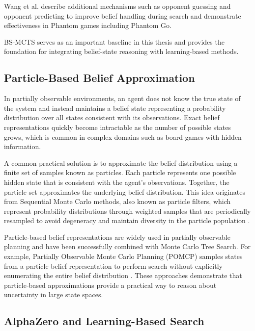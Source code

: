\documentclass[12pt,oneside,openright]{article}
\begin{document}
Wang et al. describe additional mechanisms such as opponent guessing and opponent predicting to improve belief handling during search and demonstrate effectiveness in Phantom games including Phantom Go\cite{Wang2015bsmcts}.

BS-MCTS serves as an important baseline in this thesis and provides the foundation for integrating belief-state reasoning with learning-based methods.

\subsection{Particle-Based Belief Approximation}

In partially observable environments, an agent does not know the true state of the system and instead maintains a belief state representing a probability distribution over all states consistent with its observations. Exact belief representations quickly become intractable as the number of possible states grows, which is common in complex domains such as board games with hidden information.

A common practical solution is to approximate the belief distribution using a finite set of samples known as particles. Each particle represents one possible hidden state that is consistent with the agent's observations. Together, the particle set approximates the underlying belief distribution. This idea originates from Sequential Monte Carlo methods, also known as particle filters, which represent probability distributions through weighted samples that are periodically resampled to avoid degeneracy and maintain diversity in the particle population \cite{Doucet2007particle}\cite{Arulampalam2002tutorial}.

Particle-based belief representations are widely used in partially observable planning and have been successfully combined with Monte Carlo Tree Search. For example, Partially Observable Monte Carlo Planning (POMCP) samples states from a particle belief representation to perform search without explicitly enumerating the entire belief distribution \cite{Veness2010pomdps}. These approaches demonstrate that particle-based approximations provide a practical way to reason about uncertainty in large state spaces.



\subsection{AlphaZero and Learning-Based Search}
\end{document}

